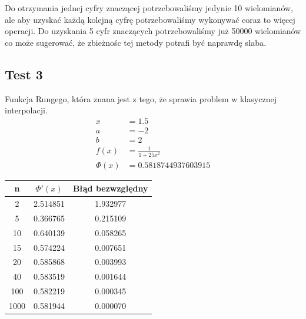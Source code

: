 \documentclass[a4paper]{article}
\begin{document}
    Do otrzymania jednej cyfry znaczącej potrzebowaliśmy jedynie 10 wielomianów, ale aby uzyskać każdą kolejną cyfrę
    potrzebowaliśmy wykonywać coraz to więcej operacji. Do uzyskania 5 cyfr znaczących potrzebowaliśmy już 50000 wielomianów
    co może sugerować, że zbieżnośc tej metody potrafi być naprawdę słaba.

\newpage
\subsection{Test 3}
    Funkcja Rungego, która znana jest z tego, że sprawia problem w klasycznej interpolacji.
    \[
        \begin{aligned}
            x &= 1.5 \\
            a & = -2 \\
            b &= 2 \\
            f(x) &= \frac{1}{1 + 25x^2} \\
            \Phi(x) &= 0.5818744937603915
        \end{aligned}
    \]

    \begin{center}
        \begin{tabular}{|c|c|c|} 
            \hline
            n & $\Phi'(x)$ & Błąd bezwzględny \\
            \hline
            2 & 2.514851 & 1.932977 \\
            \hline
            5 & 0.366765 & 0.215109 \\
            \hline
            10 & 0.640139 & 0.058265 \\
            \hline
            15 & 0.574224 & 0.007651 \\
            \hline
            20 & 0.585868 & 0.003993 \\
            \hline
            40 & 0.583519 & 0.001644 \\
            \hline
            100 & 0.582219 & 0.000345 \\
            \hline
            1000 & 0.581944 & 0.000070 \\
            \hline
        \end{tabular}
    \end{center}
\end{document}
